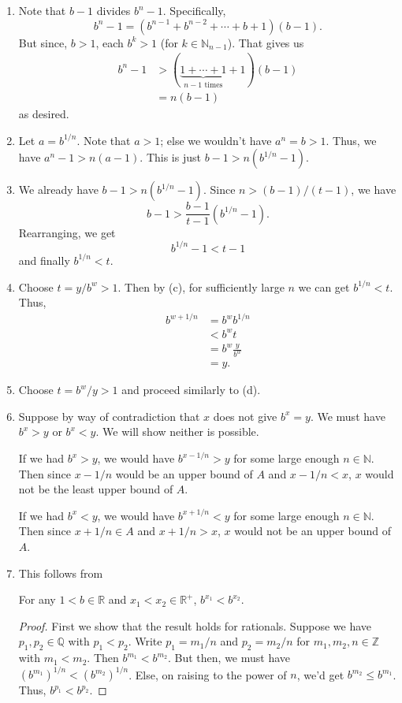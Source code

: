 \documentclass[12 pt, letterpaper]{hmcpset}
\begin{document}
\begin{solution}
	\begin{enumerate}
		\item Note that $b - 1$ divides $b^{n} - 1$. Specifically,
			\[
				b^{n} - 1 = (b^{n - 1} + b^{n - 2} + \cdots + b + 1)(b - 1).
			\]
			But since, $b > 1$, each $b^{k} > 1$ (for $k \in \mathbb{N}_{n - 1}$). That gives us
			\[
				\begin{split}
					b^{n} - 1 & > (\underbrace{1 + \cdots + 1}_{n - 1 \text{ times}} + 1)(b - 1) \\
						  & = n(b - 1)
				\end{split}
			\]
			as desired.
		\item Let $a = b^{1/n}$. Note that $a > 1$; else we wouldn't have $a^{n} = b > 1$. Thus, we have $a^{n} - 1 > n(a - 1)$. This is just $b - 1 > n(b^{1/n} - 1)$.
		\item We already have $b - 1 > n(b^{1/n} - 1)$. Since $n > (b - 1)/(t - 1)$, we have
			\[
				b - 1 > \frac{b - 1}{t - 1}(b^{1/n} - 1).
			\]
			Rearranging, we get
			\[
				b^{1/n} - 1 < t - 1
			\]
			and finally $b^{1/n} < t$.
		\item Choose $t = y/b^{w} > 1$. Then by (c), for sufficiently large $n$ we can get $b^{1/n} < t$. Thus,
			\[
				\begin{split}
					b^{w + 1/n} & = b^{w} b^{1/n} \\
						    & < b^{w} t \\
						    & = b^{w} \frac{y}{b^{w}} \\
						    & = y.
				\end{split}
			\]
		\item Choose $t = b^{w}/y > 1$ and proceed similarly to (d).
		\item Suppose by way of contradiction that $x$ does not give $b^{x} = y$. We must have $b^{x} > y$ or $b^{x} < y$. We will show neither is possible.

			If we had $b^{x} > y$, we would have $b^{x - 1/n} > y$ for some large enough $n \in \mathbb{N}$. Then since $x - 1/n$ would be an upper bound of $A$ and $x - 1/n < x$, $x$ would not be the least upper bound of $A$. 

			If we had $b^{x} < y$, we would have $b^{x + 1/n} < y$ for some large enough $n \in \mathbb{N}$. Then since $x + 1/n \in A$  and $x + 1/n > x$, $x$ would not be an upper bound of $A$.
		\item This follows from
			\begin{lemma}
				For any $1 < b \in \mathbb{R}$ and $x_{1} < x_{2} \in \mathbb{R}^{+}$, $b^{x_{1}} < b^{x_{2}}$.
			\end{lemma}
			\begin{proof}
				First we show that the result holds for rationals. Suppose we have $p_{1}, p_{2} \in \mathbb{Q}$ with $p_{1} < p_{2}$. Write $p_{1} = m_{1}/n$ and $p_{2} = m_{2}/n$ for $m_{1}, m_{2}, n \in \mathbb{Z}$ with $m_{1} < m_{2}$. Then $b^{m_{1}} < b^{m_{2}}$. But then, we must have $(b^{m_{1}})^{1/n} < (b^{m_{2}})^{1/n}$. Else, on raising to the power of $n$, we'd get $b^{m_{2}} \le b^{m_{1}}$. Thus, $b^{p_{1}} < b^{p_{2}}$.
				

\end{proof}
\end{enumerate}
\end{solution}
\end{document}
